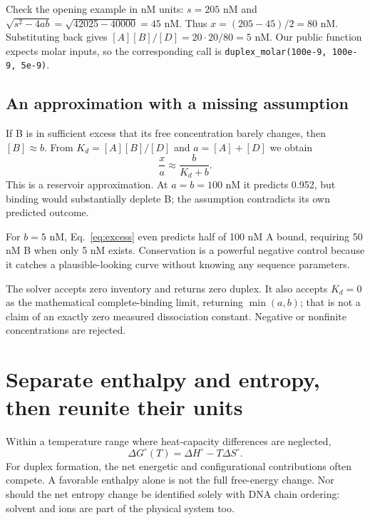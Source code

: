 Check the opening example in nM units: $s=205$ nM and
$\sqrt{s^2-4ab}=\sqrt{42025-40000}=45$ nM. Thus
$x=(205-45)/2=80$ nM. Substituting back gives
$[A][B]/[D]=20\cdot20/80=5$ nM.
Our public function expects molar inputs, so the corresponding call is
\texttt{duplex\_molar(100e-9, 100e-9, 5e-9)}.

\subsection{An approximation with a missing assumption}

If B is in sufficient excess that its free concentration barely changes,
then $[B]\approx b$. From $K_d=[A][B]/[D]$ and $a=[A]+[D]$ we obtain
\begin{equation}
\frac{x}{a}\approx\frac{b}{K_d+b}.
\label{eq:excess}
\end{equation}
This is a reservoir approximation. At $a=b=100$ nM it predicts 0.952,
but binding would substantially deplete B; the assumption contradicts its
own predicted outcome.


For $b=5$ nM, Eq.~\ref{eq:excess} even predicts half of 100 nM A bound,
requiring 50 nM B when only 5 nM exists. Conservation is a powerful
negative control because it catches a plausible-looking curve without
knowing any sequence parameters.

The solver accepts zero inventory and returns zero duplex. It also accepts
$K_d=0$ as the mathematical complete-binding limit, returning $\min(a,b)$;
that is not a claim of an exactly zero measured dissociation constant.
Negative or nonfinite concentrations are rejected.

\section{Separate enthalpy and entropy, then reunite their units}

Within a temperature range where heat-capacity differences are neglected,
\begin{equation}
\Delta G^\circ(T)=\Delta H^\circ-T\Delta S^\circ.
\label{eq:gibbs}
\end{equation}
For duplex formation, the net energetic and configurational contributions
often compete. A favorable enthalpy alone is not the full free-energy change.
Nor should the net entropy change be identified solely with DNA chain
ordering: solvent and ions are part of the physical system too.

